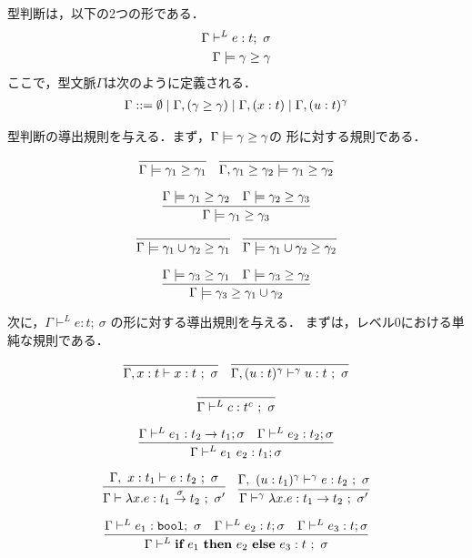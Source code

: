 型判断は，以下の2つの形である．
\begin{align*}
  \Gamma \vdash^{L} e : t ;~\sigma \\
  \Gamma \models \gamma \ge \gamma
\end{align*}
ここで，型文脈$\Gamma$は次のように定義される．
\begin{align*}
  \Gamma ::= \emptyset
  \mid \Gamma, (\gamma \ge \gamma)
  \mid \Gamma, (x : t)
  \mid \Gamma, (u : t)^{\gamma}
\end{align*}

型判断の導出規則を与える．まず，$\Gamma \models \gamma \ge \gamma$の
形に対する規則である．

\[
  \infer
  {\Gamma \models \gamma_1 \ord \gamma_1}
  {}
\quad
  \infer
  {\Gamma, \gamma_1 \ord \gamma_2 \models \gamma_1 \ord \gamma_2}
  {}
\]

\[
  \infer
  {\Gamma \models \gamma_1 \ord \gamma_3}
  {\Gamma \models \gamma_1 \ord \gamma_2 & \Gamma \models \gamma_2 \ord \gamma_3}
\]

\[
  \infer
  {\Gamma \models \gamma_1 \cup \gamma_2 \ord \gamma_1}
  {}
\quad
  \infer
  {\Gamma \models \gamma_1 \cup \gamma_2 \ord \gamma_2}
  {}
\]

\[
  \infer
  {\Gamma \models \gamma_3 \ord \gamma_1 \cup \gamma_2}
  {\Gamma \models \gamma_3 \ord \gamma_1
  &\Gamma \models \gamma_3 \ord \gamma_2}
\]



次に，$\Gamma \vdash^{L} e : t ;~\sigma$ の形に対する導出規則を与える．
まずは，レベル0における単純な規則である．

\[
  \infer
  {\Gamma, x : t \vdash x : t ~;~ \sigma}
  {}
\quad
  \infer
  {\Gamma, (u : t)^\gamma \vdash^\gamma u : t ~;~ \sigma}
  {}
\]

\[
  \infer
  {\Gamma \vdash^{L} c : t^c ~;~\sigma}
  {}
\]

\[
  \infer
  {\Gamma \vdash^{L} e_1~ e_2 : t_1 ; \sigma}
  {\Gamma \vdash^{L} e_1 : t_2 \to t_1 ; \sigma
    & \Gamma \vdash^{L} e_2 : t_2  ; \sigma
  }
\]

\[
  \infer
  {\Gamma \vdash \fun{x}{e} : \funT{t_1}{t_2}{\sigma} ~;~\sigma'}
  {\Gamma,~x : t_1 \vdash e : t_2 ~;~ \sigma}
\quad
  \infer
  {\Gamma \vdash^\gamma \fun{x}{e} : \funT{t_1}{t_2}{} ~;~\sigma'}
  {\Gamma,~(u : t_1)^\gamma \vdash^\gamma e : t_2 ~;~ \sigma}
\]

\[
  \infer
  {\Gamma \vdash^{L} \ift{e_1}{e_2}{e_3} : t ~;~ \sigma}
  {\Gamma \vdash^{L} e_1 : \boolT ;~ \sigma
    & \Gamma \vdash^{L} e_2 : t ; \sigma
    & \Gamma \vdash^{L} e_3 : t ; \sigma}
\]

